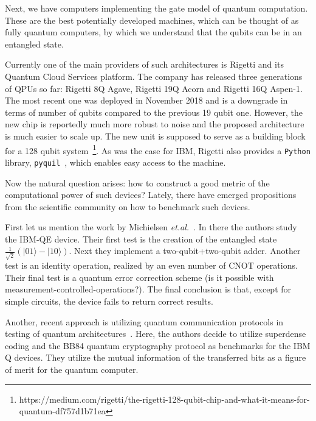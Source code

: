 \documentclass[preprint,12pt, a4paper, dvipsnames]{elsarticle}
\newcommand{\ket}[1]{\ensuremath{|#1\rangle}}
\newcommand{\1}{{\rm 1\hspace{-0.9mm}l}}
\begin{document}
Next, we have computers implementing the gate model of quantum computation.
These are the best potentially developed machines, which can be thought
of as fully quantum computers, by which we understand that the qubits can be in
an entangled state.

Currently one of the main providers of such architectures is Rigetti and its
Quantum Cloud Services platform. The company has
released three generations of QPUs so far: Rigetti 8Q Agave, Rigetti 19Q Acorn
and Rigetti 16Q Aspen-1. The most recent one was deployed in November 2018 and
is a downgrade in terms of number of qubits compared to the previous 19 qubit
one. However, the new chip is reportedly much more robust to noise and the
proposed architecture is much easier to scale up. The new unit is supposed to
serve as a building block for a 128 qubit
system~\footnote{https://medium.com/rigetti/the-rigetti-128-qubit-chip-and-what-it-means-for-quantum-df757d1b71ea}.
As was the case for IBM, Rigetti also provides a \texttt{Python} library,
\texttt{pyquil}~\cite{}, which enables easy access to the machine.



%
%


Now the natural question arises: how to construct a good metric of the
computational power of such devices?
Lately, there have emerged propositions from the scientific community on how to
benchmark such devices.

 First let us mention the work by Michielsen
\emph{et.al.}~\cite{michielsen2017benchmarking}. In there the authors study the
IBM-QE device. Their first test is the creation of the entangled state
$\frac{1}{\sqrt{2}} (\ket{01} - \ket{10})$. Next they implement a
two-qubit+two-qubit adder. Another test is an identity operation, realized by an
even number of CNOT operations. Their final test is a quantum error correction
scheme (is it possible with measurement-controlled-operations?). The final
conclusion is that, except for simple circuits, the device fails to return
correct results.

Another, recent approach is utilizing quantum communication protocols in testing
of quantum architectures~\cite{zhukov2019quantum}. Here, the authors decide to
utilize superdense coding and the BB84 quantum cryptography protocol as
benchmarks for the IBM Q devices. They utilize the mutual information of the
transferred bits as a figure of merit for the quantum computer.
\end{document}
